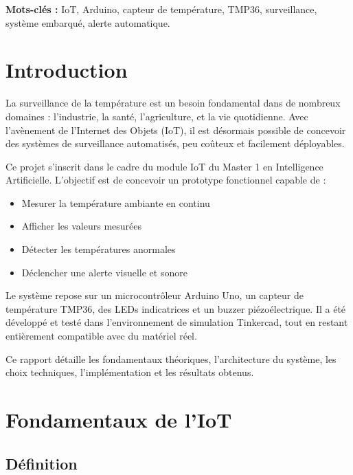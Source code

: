 \documentclass[12pt, a4paper]{article}
\begin{document}
\textbf{Mots-clés :} IoT, Arduino, capteur de température, TMP36, surveillance, système embarqué, alerte automatique.

\newpage

\section{Introduction}

La surveillance de la température est un besoin fondamental dans de nombreux domaines : l'industrie, la santé, l'agriculture, et la vie quotidienne. Avec l'avènement de l'Internet des Objets (IoT), il est désormais possible de concevoir des systèmes de surveillance automatisés, peu coûteux et facilement déployables.

Ce projet s'inscrit dans le cadre du module IoT du Master 1 en Intelligence Artificielle. L'objectif est de concevoir un prototype fonctionnel capable de :

\begin{itemize}
    \item Mesurer la température ambiante en continu
    \item Afficher les valeurs mesurées
    \item Détecter les températures anormales
    \item Déclencher une alerte visuelle et sonore
\end{itemize}

Le système repose sur un microcontrôleur Arduino Uno, un capteur de température TMP36, des LEDs indicatrices et un buzzer piézoélectrique. Il a été développé et testé dans l'environnement de simulation Tinkercad, tout en restant entièrement compatible avec du matériel réel.

Ce rapport détaille les fondamentaux théoriques, l'architecture du système, les choix techniques, l'implémentation et les résultats obtenus.

\section{Fondamentaux de l'IoT}

\subsection{Définition}
\end{document}

